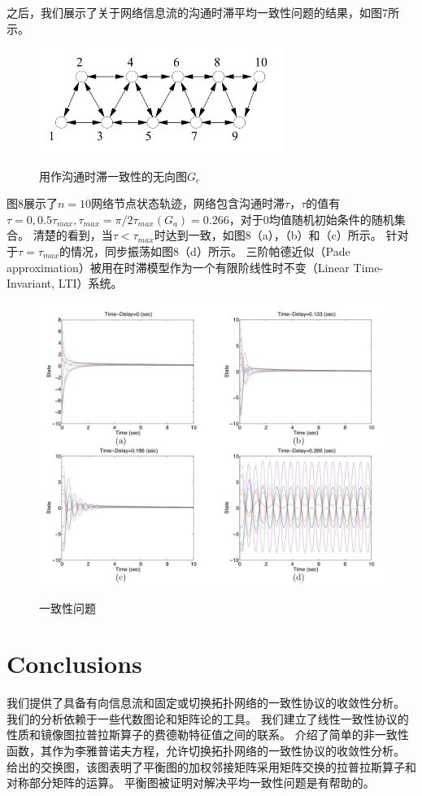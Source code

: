 \documentclass{article}
\begin{document}
之后，我们展示了关于网络信息流的沟通时滞平均一致性问题的结果，如图7所示。
\begin{figure}[htbp]
    \centering
    \includegraphics[width=8cm]{figures/Fig7-Undirected.jpeg}
    \label{Undirected}
    \caption{用作沟通时滞一致性的无向图$G_e$}
\end{figure}

图8展示了$n=10$网络节点状态轨迹，网络包含沟通时滞$\tau$，$\tau$的值有$\tau=0, 0.5\tau_{max}, \tau_{max} = \pi / 2\tau_{max}(G_a) = 0.266$，对于0均值随机初始条件的随机集合。
清楚的看到，当$\tau < \tau_{max}$时达到一致，如图8（a），（b）和（c）所示。
针对于$\tau = \tau_{max}$的情况，同步振荡如图8（d）所示。
三阶帕德近似（Pade approximation）被用在时滞模型作为一个有限阶线性时不变（Linear Time-Invariant, LTI）系统。
\begin{figure}[htbp]
    \centering
    \includegraphics[width=14.5cm]{figures/Fig8-ConsensusProblem.jpeg}
    \label{ConsensusProblem}
    \caption{一致性问题}
\end{figure}


\section{Conclusions}
我们提供了具备有向信息流和固定或切换拓扑网络的一致性协议的收敛性分析。
我们的分析依赖于一些代数图论和矩阵论的工具。
我们建立了线性一致性协议的性质和镜像图拉普拉斯算子的费德勒特征值之间的联系。
介绍了简单的非一致性函数，其作为李雅普诺夫方程，允许切换拓扑网络的一致性协议的收敛性分析。
给出的交换图，该图表明了平衡图的加权邻接矩阵采用矩阵交换的拉普拉斯算子和对称部分矩阵的运算。
平衡图被证明对解决平均一致性问题是有帮助的。
\end{document}

